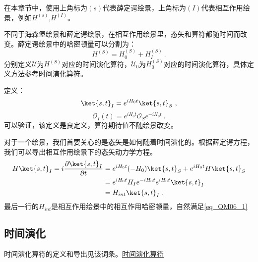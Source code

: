 
在本章节中，使用上角标为$(s)$代表薛定谔绘景，上角标为$(I)$代表相互作用绘景，例如$H^{(s)}$,$H^{(I)}$。

\begin{definition}{}

不同于海森堡绘景和薛定谔绘景，在相互作用绘景里，态矢和算符都随时间而改变。薛定谔绘景中的哈密顿量可以分割为：
\begin{equation}
H^{(S)}=H^{(S)}_0+H^{(S)}_I~.
\end{equation}
分别定义$\mathcal U$为$H^{(S)}$对应的时间演化算符，$\mathcal U_0$为$H^{(S)}_0$对应的时间演化算符，具体定义方法参考\href{https://wuli.wiki/online/TOprt.html}{时间演化算符}。

定义：
\begin{equation}
\ket{s,t}_I=e^{iH_0 t}\ket{s,t}_S~,
\end{equation}
\begin{equation}\label{eq_QM06_1}
\mathcal O_I(t)=e^{iH_0 t}\mathcal O_Se^{-iH_0 t}~.
\end{equation}
可以验证，该定义是良定义，算符期待值不随绘景改变。
\end{definition}
对于一个绘景，我们首要关心的是态矢是如何随着时间演化的。根据薛定谔方程，我们可以导出相互作用绘景下的态矢动力学方程。
\begin{equation}
\begin{aligned}
H\ket{s,t}_I=i\frac{\partial\ket{s,t}_I}{\partial t}&= e^{iH_0 t}(-H_0)\ket{s,t}_S+e^{iH_0 t}H\ket{s,t}_S\\
&=e^{iH_0 t}H_Ie^{-iH_0 t}e^{iH_0 t}\ket{s,t}_I\\
&=H_{int}\ket{s,t}_I~.
\end{aligned}
\end{equation}
最后一行的$H_{int}$是相互作用绘景中的相互作用哈密顿量，自然满足\autoref{eq_QM06_1} 
\subsection{时间演化}
时间演化算符的定义和导出见该词条。\href{https://wuli.wiki/online/TOprt.html}{时间演化算符}


